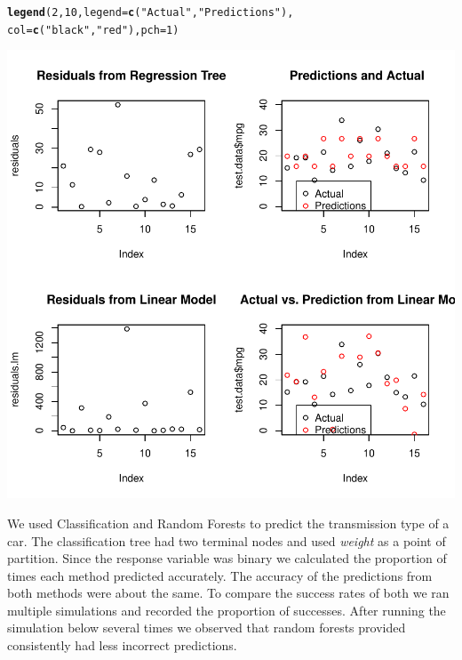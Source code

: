 \documentclass{article}\usepackage[]{graphicx}\usepackage[]{color}
\makeatletter
\def\maxwidth{ %
  \ifdim\Gin@nat@width>\linewidth
    \linewidth
  \else
    \Gin@nat@width
  \fi
}
\newcommand{\hlnum}[1]{\textcolor[rgb]{0.686,0.059,0.569}{#1}}%
\newcommand{\hlstr}[1]{\textcolor[rgb]{0.192,0.494,0.8}{#1}}%
\newcommand{\hlstd}[1]{\textcolor[rgb]{0.345,0.345,0.345}{#1}}%
\newcommand{\hlkwc}[1]{\textcolor[rgb]{0.333,0.667,0.333}{#1}}%
\newcommand{\hlkwd}[1]{\textcolor[rgb]{0.737,0.353,0.396}{\textbf{#1}}}%
\newenvironment{kframe}{%
 \def\at@end@of@kframe{}%
 \ifinner\ifhmode%
  \def\at@end@of@kframe{\end{minipage}}%
  \begin{minipage}{\columnwidth}%
 \fi\fi%
 \def\FrameCommand##1{\hskip\@totalleftmargin \hskip-\fboxsep
 \colorbox{shadecolor}{##1}\hskip-\fboxsep
     \hskip-\linewidth \hskip-\@totalleftmargin \hskip\columnwidth}%
 \MakeFramed {\advance\hsize-\width
   \@totalleftmargin\z@ \linewidth\hsize
   \@setminipage}}%
 {\par\unskip\endMakeFramed%
 \at@end@of@kframe}
\newenvironment{knitrout}{}{} %
\makeatother
\begin{document}
\begin{knitrout}
\begin{kframe}
\begin{alltt}
\hlkwd{legend}\hlstd{(}\hlnum{2}\hlstd{,} \hlnum{10}\hlstd{,} \hlkwc{legend}\hlstd{=}\hlkwd{c}\hlstd{(}\hlstr{"Actual"}\hlstd{,} \hlstr{"Predictions"}\hlstd{),}
       \hlkwc{col}\hlstd{=}\hlkwd{c}\hlstd{(}\hlstr{"black"}\hlstd{,} \hlstr{"red"}\hlstd{),}\hlkwc{pch} \hlstd{=} \hlnum{1}\hlstd{)}
\end{alltt}
\end{kframe}
\includegraphics[width=\maxwidth]{figure/unnamed-chunk-2-2} 

\end{knitrout}


We used Classification and Random Forests to predict the transmission type of a car. The classification tree had two terminal nodes and used \textit{weight} as a point of partition. Since the response variable was binary we calculated the proportion of times each method predicted  accurately. The accuracy of the predictions from both methods were about the same. To compare the success rates of both we ran multiple simulations and recorded the proportion of successes. After running the simulation below several times we observed that random forests provided consistently had less incorrect predictions. 
\end{document}
